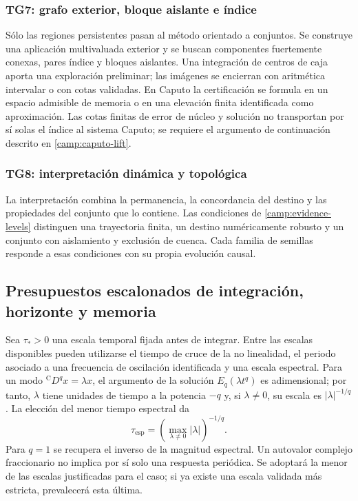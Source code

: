 \subsubsection*{TG7: grafo exterior, bloque aislante e índice}

Sólo las regiones persistentes pasan al método orientado a conjuntos. Se
construye una aplicación multivaluada exterior y se buscan componentes
fuertemente conexas, pares índice y bloques aislantes. Una integración de
centros de caja aporta una exploración preliminar; las imágenes se encierran con aritmética
intervalar o con cotas validadas. En Caputo la certificación se formula en un
espacio admisible de memoria o en una elevación finita identificada como
aproximación. Las cotas finitas de error de núcleo y solución no transportan
por sí solas el índice al sistema Caputo; se requiere el argumento de
continuación descrito en \cref{camp:caputo-lift}.

\subsubsection*{TG8: interpretación dinámica y topológica}

La interpretación combina la permanencia, la concordancia del destino y las
propiedades del conjunto que lo contiene. Las condiciones de
\cref{camp:evidence-levels} distinguen una trayectoria finita, un destino
numéricamente robusto y un conjunto con aislamiento y exclusión de cuenca.
Cada familia de semillas responde a esas condiciones con su propia evolución
causal.

\subsection{Presupuestos escalonados de integración, horizonte y memoria}
\label{camp:budgets}

Sea \(\tau_*>0\) una escala temporal fijada antes de integrar. Entre las
escalas disponibles pueden utilizarse el tiempo de cruce de la no linealidad,
el periodo asociado a una frecuencia de oscilación identificada y una escala
espectral. Para un modo \({}^{\mathrm C}D^q x=\lambda x\), el argumento de la
solución \(E_q(\lambda t^q)\) es adimensional; por tanto, \(\lambda\) tiene
unidades de tiempo a la potencia \(-q\) y, si \(\lambda\ne0\), su escala es
\(|\lambda|^{-1/q}\). La elección del menor tiempo espectral da
\[
 \tau_{\mathrm{esp}}=
 \left(\max_{\lambda\ne0}|\lambda|\right)^{-1/q}.
\]
Para \(q=1\) se recupera el inverso de la magnitud espectral. Un autovalor
complejo fraccionario no implica por sí solo una respuesta periódica. Se
adoptará la menor de las escalas justificadas para el caso; si ya existe una
escala validada más estricta, prevalecerá esta última.

